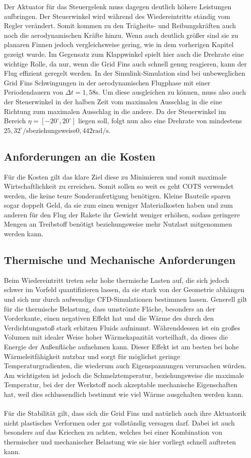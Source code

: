 Der Aktuator für das Steuergelenk muss dagegen deutlich höhere Leistungen aufbringen. Der Steuerwinkel wird während des Wiedereintritts ständig vom Regler verändert. Somit kommen zu den Trägheits- und Reibungskräften auch noch die aerodynamischen Kräfte hinzu. Wenn auch deutlich größer sind sie zu planaren Finnen jedoch vergleichsweise gering, wie in dem vorherigen Kapitel gezeigt wurde. Im Gegensatz zum Klappwinkel spielt hier auch die Drehrate eine wichtige Rolle, da nur, wenn die Grid Fins auch schnell genug reagieren, kann der Flug effizient geregelt werden. In der Simulink-Simulation sind bei unbeweglichen Grid Fins Schwingungen in der aerodynamischen Flugphase mit einer Periodendauern von $\Delta t=1,58$s. Um diese ausgleichen zu können, muss also auch der Steuerwinkel in der halben Zeit vom maximalen Ausschlag in die eine Richtung zum maximalen Ausschlag in die andere. Da der Steuerwinkel im Bereich $\eta = [-20^\circ,20^\circ]$ liegen soll, folgt nun also eine Drehrate von mindestens $25,32^\circ/\mathrm{s}$beziehungsweise$0,442\mathrm{rad/s}$.
\subsection{Anforderungen an die Kosten}
Für die Kosten gilt das klare Ziel diese zu Minimieren und somit maximale Wirtschaftlichkeit zu erreichen. Somit sollen so weit es geht COTS verwendet werden, die keine teure Sonderanfertigung benötigen. Kleine Bauteile sparen sogar doppelt Geld, da sie zum einen weniger Materialkosten haben und zum anderen für den Flug der Rakete ihr Gewicht weniger erhöhen, sodass geringere Mengen an Treibstoff benötigt beziehungsweise mehr Nutzlast mitgenommen werden kann.
\subsection{Thermische und Mechanische Anforderungen}
Beim Wiedereintritt treten sehr hohe thermische Lasten auf, die sich jedoch schwer im Vorfeld quantifizieren lassen, da sie stark von der Geometrie abhängen und sich nur durch aufwendige CFD-Simulationen bestimmen lassen. Generell gilt für die thermische Belastung, dass umströmte Fläche, besonders an der Vorderkante, einen negativen Effekt hat und die Wärme des durch den Verdichtungsstoß stark erhitzen Fluids aufnimmt. Währenddessen ist ein großes Volumen mit idealer Weise hoher Wärmekapazität vorteilhaft, da dieses die Energie der Außenfläche aufnehmen kann. Dieser Effekt ist am besten bei hohe Wärmeleitfähigkeit nutzbar und sorgt für möglichst geringe Temperaturgradienten, die wiederum auch Eigenspannungen verursachen würden. Am wichtigsten ist jedoch die Schmelztemperatur, beziehungsweise die maximale Temperatur, bei der der Werkstoff noch akzeptable mechanische Eigenschaften hat, weil dies schlussendlich bestimmt wie viel Wärme ausgehalten werden kann.
\\~\\
Für die Stabilität gilt, dass sich die Grid Fins und natürlich auch ihre Aktuatorik nicht plastisches Verformen oder gar vollständig versagen darf. Dabei ist auch besonders auf das Kriechen zu achten, welches bei einer Kombination von thermischer und mechanischer Belastung wie sie hier vorliegt schnell auftreten kann.

